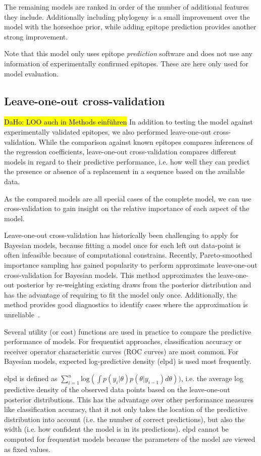 \documentclass[fleqn,11pt]{SelfArx} %
\begin{document}
The remaining models are ranked in order of the number of additional features they include. Additionally including phylogeny is a small improvement over the model with the horseshoe prior, while adding epitope prediction provides another strong improvement.

Note that this model only uses epitope \textit{prediction} software and does not use any information of experimentally confirmed epitopes. These are here only used for model evaluation.

\subsection{Leave-one-out cross-validation}
\hl{DaHo: LOO auch in Methods einführen}
In addition to testing the model against experimentally validated epitopes, we also performed leave-one-out cross-validation. While the comparison against known epitopes compares inferences of the regression coefficients, leave-one-out cross-validation compares different models in regard to their predictive performance, i.e. how well they can predict the presence or absence of a replacement in a sequence based on the available data.

As the compared models are all special cases of the complete model, we can use cross-validation to gain insight on the relative importance of each aspect of the model.

Leave-one-out cross-validation has historically been challenging to apply for Bayesian models, because fitting a model once for each left out data-point is often infeasible because of computational constrains.
Recently, Pareto-smoothed importance sampling has gained popularity to perform approximate leave-one-out cross-validation for Bayesian models. This method  approximates the leave-one-out posterior by re-weighting existing draws from the posterior distribution and has the advantage of requiring to fit the model only once. Additionally, the method provides good diagnostics to identify cases where the approximation is unreliable~\cite{Vehtari2016}.

Several utility (or cost) functions are used in practice to compare the predictive performance of models. For frequentist approaches, classification accuracy or receiver operator characteristic curves (ROC curves) are most common.
For Bayesian models, expected log-predictive density (elpd) is used most frequently. 

elpd is defined as \(\sum_{i=1}^{n}\text{log}(\int p(y_i|\theta)p(\theta|y_{i-1})d\theta))\), i.e. the average log predictive density of the observed data points based on the leave-one-out posterior distributions.
This has the advantage over other performance measures like classification accuracy, that it not only takes the location of the predictive distribution into account (i.e. the number of correct predictions), but also the width (i.e. how confident the model is in its predictions).
elpd cannot be computed for frequentist models because the parameters of the model are viewed as fixed values.
\end{document}
